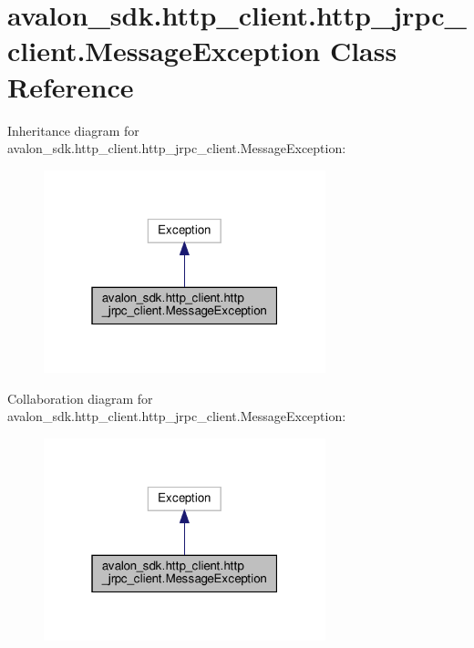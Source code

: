 \hypertarget{classavalon__sdk_1_1http__client_1_1http__jrpc__client_1_1MessageException}{}\section{avalon\+\_\+sdk.\+http\+\_\+client.\+http\+\_\+jrpc\+\_\+client.\+Message\+Exception Class Reference}
\label{classavalon__sdk_1_1http__client_1_1http__jrpc__client_1_1MessageException}


Inheritance diagram for avalon\+\_\+sdk.\+http\+\_\+client.\+http\+\_\+jrpc\+\_\+client.\+Message\+Exception\+:
\nopagebreak
\begin{figure}[H]
\begin{center}
\leavevmode
\includegraphics[width=232pt]{classavalon__sdk_1_1http__client_1_1http__jrpc__client_1_1MessageException__inherit__graph}
\end{center}
\end{figure}


Collaboration diagram for avalon\+\_\+sdk.\+http\+\_\+client.\+http\+\_\+jrpc\+\_\+client.\+Message\+Exception\+:
\nopagebreak
\begin{figure}[H]
\begin{center}
\leavevmode
\includegraphics[width=232pt]{classavalon__sdk_1_1http__client_1_1http__jrpc__client_1_1MessageException__coll__graph}
\end{center}
\end{figure}


